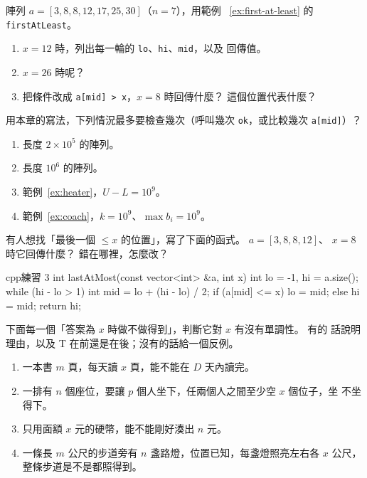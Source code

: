 \begin{drills}[label=drills:ch3]
\item 陣列 $a = [3, 8, 8, 12, 17, 25, 30]$（$n = 7$），用範例
~\ref{ex:first-at-least} 的 \texttt{firstAtLeast}。
\begin{enumerate}
\item $x = 12$ 時，列出每一輪的 \texttt{lo}、\texttt{hi}、\texttt{mid}，以及
回傳值。
\item $x = 26$ 時呢？
\item 把條件改成 \texttt{a[mid] > x}，$x = 8$ 時回傳什麼？ 這個位置代表什麼？
\end{enumerate}

\item 用本章的寫法，下列情況最多要檢查幾次（呼叫幾次 \texttt{ok}，或比較幾次
\texttt{a[mid]}）？
\begin{enumerate}
\item 長度 $2 \times 10^5$ 的陣列。
\item 長度 $10^6$ 的陣列。
\item 範例~\ref{ex:heater}，$U - L = 10^9$。
\item 範例~\ref{ex:coach}，$k = 10^9$、$\max b_i = 10^9$。
\end{enumerate}

\item 有人想找「最後一個 $\le x$ 的位置」，寫了下面的函式。 $a = [3, 8, 8, 12]$、
$x = 8$ 時它回傳什麼？ 錯在哪裡，怎麼改？
\begin{code}{cpp}{練習 3}
int lastAtMost(const vector<int> &a, int x) {
    int lo = -1, hi = a.size();
    while (hi - lo > 1) {
        int mid = lo + (hi - lo) / 2;
        if (a[mid] <= x) {
            lo = mid;
        } else {
            hi = mid;
        }
    }
    return hi;
}
\end{code}

\item 下面每一個「答案為 $x$ 時做不做得到」，判斷它對 $x$ 有沒有單調性。 有的
話說明理由，以及 T 在前還是在後；沒有的話給一個反例。
\begin{enumerate}
\item 一本書 $m$ 頁，每天讀 $x$ 頁，能不能在 $D$ 天內讀完。
\item 一排有 $n$ 個座位，要讓 $p$ 個人坐下，任兩個人之間至少空 $x$ 個位子，坐
不坐得下。
\item 只用面額 $x$ 元的硬幣，能不能剛好湊出 $n$ 元。
\item 一條長 $m$ 公尺的步道旁有 $n$ 盞路燈，位置已知，每盞燈照亮左右各 $x$
公尺，整條步道是不是都照得到。
\end{enumerate}


\end{drills}
